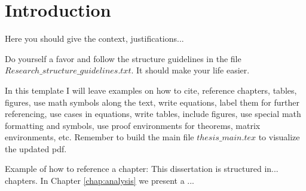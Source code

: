 \chapter{Introduction} \label{chap:intro}

Here you should give the context, justifications...

Do yourself a favor and follow the structure guidelines in the file $Research\_structure\_guidelines.txt$. It should make your life easier.

In this template I will leave examples on how to cite, reference chapters, tables, figures, use math symbols along the text, write equations, label them for further referencing, use cases in equations, write tables, include figures, use special math formatting and symbols, use proof environments for theorems, matrix environments, etc. Remember to build the main file $thesis\_main.tex$ to visualize the updated pdf.

Example of how to reference a chapter: This dissertation is structured in... chapters. In Chapter \ref{chap:analysis} we present a ...

\cite{ait2001a}
